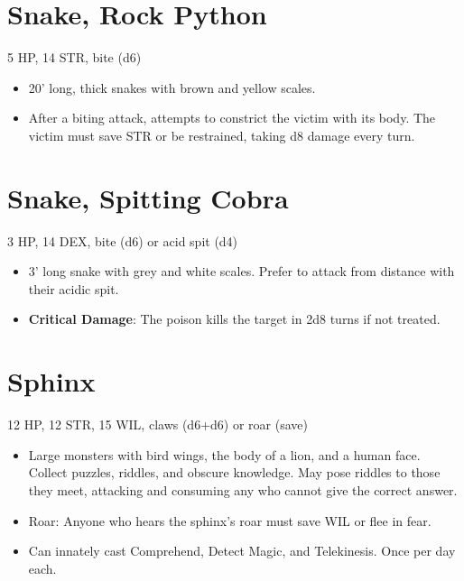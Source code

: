 \documentclass[
  10pt,
  american,
]{article}
\begin{document}
\hypertarget{snake-rock-python}{%
\section{Snake, Rock Python}\label{snake-rock-python}}

5 HP, 14 STR, bite (d6)

\begin{samepage}
\begin{itemize}
\setlength\itemsep{-.5em}
\item 20' long, thick snakes with brown and yellow scales.
\item After a biting attack, attempts to constrict the victim with its body. The victim must save STR or be restrained, taking d8 damage every turn. 
\end{itemize}
\end{samepage}

\hypertarget{snake-spitting-cobra}{%
\section{Snake, Spitting Cobra}\label{snake-spitting-cobra}}

3 HP, 14 DEX, bite (d6) or acid spit (d4)

\begin{samepage}
\begin{itemize}
\setlength\itemsep{-.5em}
\item 3' long snake with grey and white scales. Prefer to attack from distance with their acidic spit.
\item \textbf{Critical Damage}: The poison kills the target in 2d8 turns if not treated.
\end{itemize}
\end{samepage}

\hypertarget{sphinx}{%
\section{Sphinx}\label{sphinx}}

12 HP, 12 STR, 15 WIL, claws (d6+d6) or roar (save)

\begin{samepage}
\begin{itemize}
\setlength\itemsep{-.5em}
\item Large monsters with bird wings, the body of a lion, and a human face. Collect puzzles, riddles, and obscure knowledge. May pose riddles to those they meet, attacking and consuming any who cannot give the correct answer.
\item Roar: Anyone who hears the sphinx's roar must save WIL or flee in fear.
\item Can innately cast Comprehend, Detect Magic, and Telekinesis. Once per day each.
\end{itemize}
\end{samepage}
\end{document}
